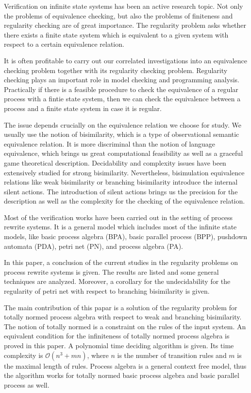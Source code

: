 \begin{englishabstract}

Verification on infinite state systems has been an active research topic. Not only the problems of equivalence checking, but also the problems of finiteness and regularity checking are of great importance. The regularity problem asks whether there exists a finite state system which is equivalent to a given system with respect to a certain equivalence relation. 

It is often profitable to carry out our correlated investigations into an equivalence checking problem together with its regularity checking problem. Regularity checking plays an important role in model checking and programming analysis. Practically if there is a feasible procedure to check the equivalence of a regular process with a fintie state system, then we can check the equivalence between a process and a finite state system in case it is regular.

The issue depends crucially on the equivalence relation we choose for study. We usually use the notion of bisimilarity, which is a type of observational semantic equivalence relation. It is more discriminal than the notion of language equivalence, which brings us great computational feasibility as well as a graceful game theoretical description. Decidability and complexity issues have been extensively studied for strong bisimilarity. Nevertheless, bisimulation equivalence relations like weak bisimilarity or branching bisimilarity introduce the internal silent actions. The introduction of silent actions brings us the precision for the description as well as the complexity for the checking of the equivalence relation.

Most of the verification works have been carried out in the setting of process rewrite systems. It is a general model which includes most of the infinite state models, like basic process algebra (BPA), basic parallel process (BPP), pushdown automata (PDA), petri net (PN), and process algebra (PA).

In this paper, a conclusion of the current studies in the regularity problems on process rewrite systems is given. The results are listed and some general techniques are analyzed. Moreover, a corollary for the undecidability for the regularity of petri net with respect to branching bisimilarity is given.

The main contribution of this papar is a solution of the regularity problem for totally normed process algebra with respect to weak and branching bisimilarity. The notion of totally normed is a constraint on the rules of the input system. An equivalent condition for the infiniteness of totally normed process algebra is proved in this paper. A polynomial time deciding algorithm is given. Its time complexity is $\mathscr{O}(n^3+mn)$, where $n$ is the number of transition rules and $m$ is the maximal length of rules. Process algebra is a general context free model, thus the algorithm works for totally normed basic process algebra and basic parallel process as well.


\end{englishabstract}
